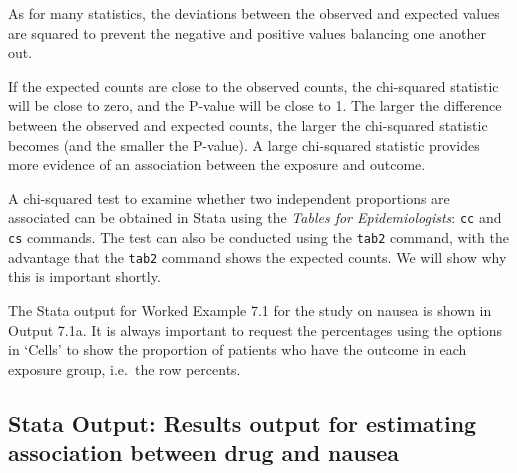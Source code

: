 \documentclass[
]{memoir}
\begin{document}
As for many statistics, the deviations between the observed and expected values are squared to prevent the negative and positive values balancing one another out.

If the expected counts are close to the observed counts, the chi-squared statistic will be close to zero, and the P-value will be close to 1. The larger the difference between the observed and expected counts, the larger the chi-squared statistic becomes (and the smaller the P-value). A large chi-squared statistic provides more evidence of an association between the exposure and outcome.

A chi-squared test to examine whether two independent proportions are associated can be obtained in Stata using the \emph{Tables for Epidemiologists}: \texttt{cc} and \texttt{cs} commands. The test can also be conducted using the \texttt{tab2} command, with the advantage that the \texttt{tab2} command shows the expected counts. We will show why this is important shortly.

The Stata output for Worked Example 7.1 for the study on nausea is shown in Output 7.1a. It is always important to request the percentages using the options in `Cells' to show the proportion of patients who have the outcome in each exposure group, i.e.~the row percents.

\hypertarget{stata-output-results-output-for-estimating-association-between-drug-and-nausea}{%
\subsection{Stata Output: Results output for estimating association between drug and nausea}\label{stata-output-results-output-for-estimating-association-between-drug-and-nausea}}
\end{document}
